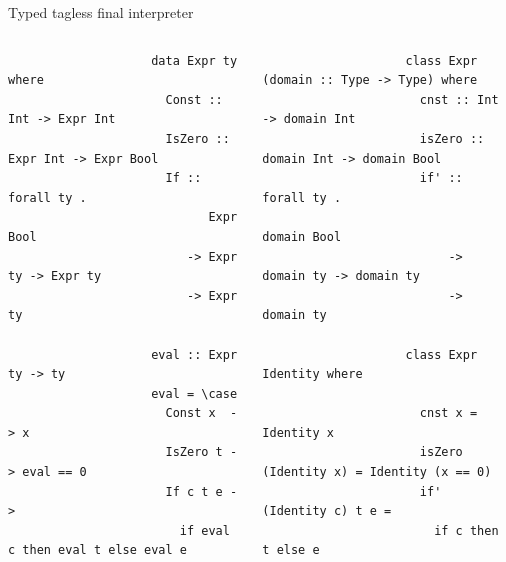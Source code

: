     \begin{frame}[fragile]{Typed tagless final interpreter}
        \vspace{-1em}
        \begin{columns}[onlytextwidth]
            \begin{column}[t]{0.485\textwidth}
                \begin{verbatim}
                    data Expr ty where
                      Const :: Int -> Expr Int
                      IsZero :: Expr Int -> Expr Bool
                      If :: forall ty .
                            Expr Bool
                         -> Expr ty -> Expr ty
                         -> Expr ty

                    eval :: Expr ty -> ty
                    eval = \case
                      Const x  -> x
                      IsZero t -> eval == 0
                      If c t e ->
                        if eval c then eval t else eval e
                \end{verbatim}
            \end{column}\hfill%
            \begin{column}[t]{0.495\textwidth}
                \begin{verbatim}
                    class Expr (domain :: Type -> Type) where
                      cnst :: Int -> domain Int
                      isZero :: domain Int -> domain Bool
                      if' :: forall ty .
                             domain Bool
                          -> domain ty -> domain ty
                          -> domain ty

                    class Expr Identity where

                      cnst x = Identity x
                      isZero (Identity x) = Identity (x == 0)
                      if' (Identity c) t e =
                        if c then t else e
                \end{verbatim}
            \end{column}
        \end{columns}
    \end{frame}

